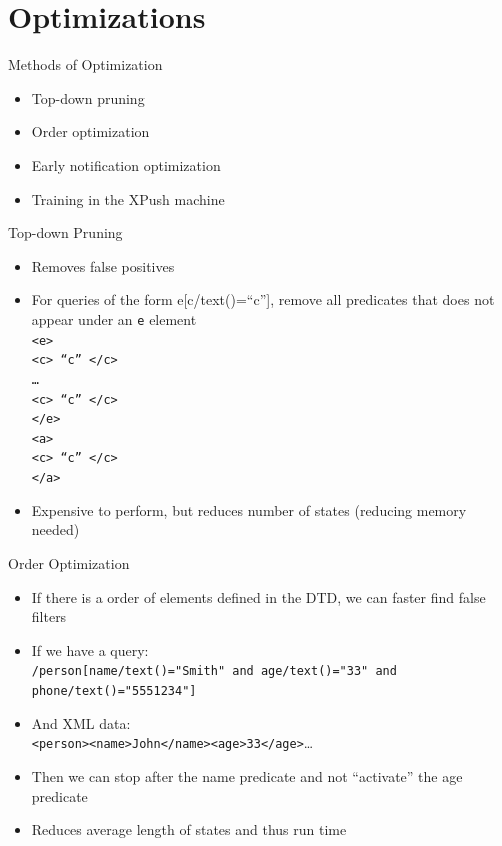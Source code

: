 \documentclass[mathserif,serif]{beamer}
\begin{document}
  \section{Optimizations}
  \begin{frame}{Methods of Optimization}
    \begin{itemize}
      \item Top-down pruning
      \item Order optimization
      \item Early notification optimization
      \item Training in the XPush machine
    \end{itemize}
  \end{frame}

  \begin{frame}{Top-down Pruning}
    \begin{itemize}
      \item Removes false positives
      \item For queries of the form e[c/text()=``c''], remove all predicates that does not appear under an \texttt{e} element\\ 
        \texttt{<e> \\
          \quad <c> ``c'' </c> \\
          \quad \dots \\
          \quad <c> ``c'' </c>\\ 
          </e>\\
          <a> \\
          \quad <c> ``c'' </c> \\
        </a>}
      \item Expensive to perform, but reduces number of states (reducing memory needed)
    \end{itemize}
  \end{frame}

  \begin{frame}{Order Optimization}
    \begin{itemize}
      \item If there is a order of elements defined in the DTD, we can faster find false filters
      \item If we have a query:\\ \texttt{/person[name/text()="Smith" and age/text()="33" and phone/text()="5551234"]}
      \item And XML data: \\ \texttt{<person><name>John</name><age>33</age>}\dots
      \item Then we can stop after the name predicate and not ``activate'' the age predicate
      \item Reduces average length of states and thus run time 
    \end{itemize}
  \end{frame}
\end{document}
